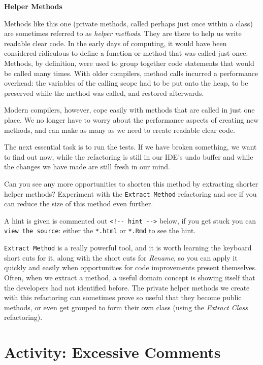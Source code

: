 \documentclass[
]{book}
\begin{document}
\textbf{Helper Methods}

Methods like this one (private methods, called perhaps just once within a class) are sometimes referred to as \emph{helper methods}. They are there to help us write readable clear code. In the early days of computing, it would have been considered ridiculous to define a function or method that was called just once. Methods, by definition, were used to group together code statements that would be called many times. With older compilers, method calls incurred a performance overhead: the variables of the calling scope had to be put onto the heap, to be preserved while the method was called, and restored afterwards.

Modern compilers, however, cope easily with methods that are called in just one place. We no longer have to worry about the performance aspects of creating new methods, and can make as many as we need to create readable clear code.

The next essential task is to run the tests. If we have broken something, we want to find out now, while the refactoring is still in our IDE's undo buffer and while the changes we have made are still fresh in our mind.

Can you see any more opportunities to shorten this method by extracting shorter helper methods? Experiment with the \texttt{Extract\ Method} refactoring and see if you can reduce the size of this method even further.

A hint is given is commented out \texttt{\textless{}!-\/-\ hint\ -\/-\textgreater{}} below, if you get stuck you can \texttt{view\ the\ source}: either the \texttt{*.html} or \texttt{*.Rmd} to see the hint.

\texttt{Extract\ Method} is a really powerful tool, and it is worth learning the keyboard short cuts for it, along with the short cuts for \emph{Rename}, so you can apply it quickly and easily when opportunities for code improvements present themselves. Often, when we extract a method, a useful domain concept is showing itself that the developers had not identified before. The private helper methods we create with this refactoring can sometimes prove so useful that they become public methods, or even get grouped to form their own class (using the \emph{Extract Class} refactoring).

\hypertarget{excessive}{%
\section{Activity: Excessive Comments}\label{excessive}}
\end{document}
